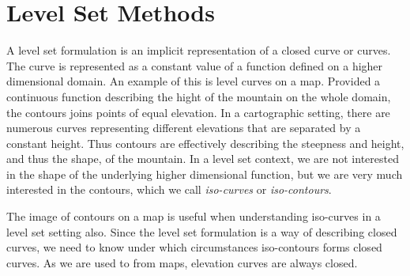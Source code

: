 \chapter{Level Set Methods}
\newcommand{\uxt}{$u(\mathbf{x}, t)$ }

A level set formulation is an implicit representation of a closed curve or curves. 
The curve is represented as a constant value of a function defined on a higher
dimensional domain. An example of this is level curves on a map. Provided 
a continuous function describing the hight of the mountain on the whole
domain, the contours joins points of equal elevation. In a cartographic
setting, there are numerous curves representing different elevations that 
are separated by a constant height. Thus contours are effectively describing
the steepness and height, and thus the shape, of the mountain. In a level set
context, we are not interested in the shape of the underlying higher dimensional
function, but we are very much interested in the contours, which we call 
\textit{iso-curves} or \textit{iso-contours}.

The image of contours on a map is useful when understanding iso-curves in a
level set setting also. Since the level set formulation is a way of describing
closed curves, we need to know under which circumstances iso-contours forms 
closed curves. As we are used to from maps, elevation curves are always closed.

